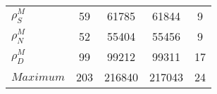 \begin{center}
\begin{longtable}{lcccc}
$ {\rho^{M}_{S}}       $	 & 	                   59	 & 	                61785	 & 	                61844	 & 	                    9 \\ 
$ {\rho^{M}_{N}}       $	 & 	                   52	 & 	                55404	 & 	                55456	 & 	                    9 \\ 
$ {\rho^{M}_{D}}       $	 & 	                   99	 & 	                99212	 & 	                99311	 & 	                   17 \\ 
$Maximum               $	 & 	                  203	 & 	               216840	 & 	               217043	 & 	                   24 \\ 
\end{longtable}
 \end{center}
